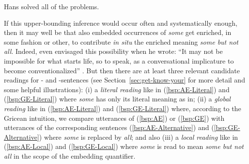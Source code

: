 \documentclass[fleqn,reqno,10pt]{article}
\newcommand{\as}{\acro{as}}
\renewcommand{\es}{\acro{es}}
\begin{document}
\begin{exe}
    \begin{xlist}
       \label{bsp:Plain-SI-Alternative} Hans solved all of the problems.
    \end{xlist}
\end{exe}

\noindent If this upper-bounding inference would occur often and
systematically enough, then it may well be that also embedded
occurrences of \emph{some} get enriched, in some fashion or other, to
contribute \emph{in situ} the enriched meaning \emph{some but not
  all}. Indeed, even \citeauthor{Grice1975:Logic-and-Conve} envisaged
this possibility when he wrote: ``It may not be impossible for what
starts life, so to speak, as a conversational implicature to become
conventionalized'' \citep[p.58]{Grice1975:Logic-and-Conve}. But then
there are at least three relevant candidate readings for \as- and
\es-sentences (see Section~\ref{sec:get-know-your} for more detail and
some helpful illustrations): (i) a \emph{literal reading} like in
(\ref{bsp:AE-Literal}) and (\ref{bsp:GE-Literal}) where \emph{some}
has only its literal meaning as in; (ii) a \emph{global reading} like
in (\ref{bsp:AE-Literal}) and (\ref{bsp:GE-Literal}) where, according
to the Gricean intuition, we compare utterances of (\ref{bsp:AE}) or
(\ref{bsp:GE}) with utterances of the corresponding sentences
(\ref{bsp:AE-Alternative}) and (\ref{bsp:GE-Alternative}) where
\emph{some} is replaced by \emph{all}; and also (iii) a \emph{local
  reading} like in (\ref{bsp:AE-Local}) and (\ref{bsp:GE-Local}) where
\emph{some} is read to mean \emph{some but not all} in the scope of
the embedding quantifier.


\setcounter{exx}{0}
\end{document}
